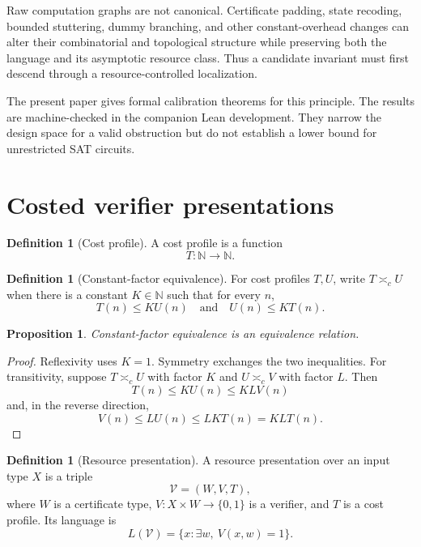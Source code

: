 \documentclass[11pt]{article}
\newtheorem{proposition}[theorem]{Proposition}
\theoremstyle{definition}
\newtheorem{definition}[theorem]{Definition}
\begin{document}
Raw computation graphs are not canonical.  Certificate padding, state
recoding, bounded stuttering, dummy branching, and other constant-overhead
changes can alter their combinatorial and topological structure while
preserving both the language and its asymptotic resource class.  Thus a
candidate invariant must first descend through a resource-controlled
localization.

The present paper gives formal calibration theorems for this principle.  The
results are machine-checked in the companion Lean development.  They narrow
the design space for a valid obstruction but do not establish a lower bound
for unrestricted SAT circuits.

\section{Costed verifier presentations}

\begin{definition}[Cost profile]
A cost profile is a function
\[
  T:\mathbb N\to\mathbb N.
\]
\end{definition}

\begin{definition}[Constant-factor equivalence]
For cost profiles \(T,U\), write \(T\asymp_c U\) when there is a constant
\(K\in\mathbb N\) such that for every \(n\),
\[
  T(n)\le K U(n)
  \quad\text{and}\quad
  U(n)\le K T(n).
\]
\end{definition}

\begin{proposition}
Constant-factor equivalence is an equivalence relation.
\end{proposition}

\begin{proof}
Reflexivity uses \(K=1\).  Symmetry exchanges the two inequalities.  For
transitivity, suppose \(T\asymp_c U\) with factor \(K\) and
\(U\asymp_c V\) with factor \(L\).  Then
\[
  T(n)\le K U(n)\le KL V(n)
\]
and, in the reverse direction,
\[
  V(n)\le L U(n)\le LK T(n)=KL T(n).
\]
\end{proof}

\begin{definition}[Resource presentation]
A resource presentation over an input type \(X\) is a triple
\[
  \mathcal V=(W,V,T),
\]
where \(W\) is a certificate type,
\(V:X\times W\to\{0,1\}\) is a verifier, and \(T\) is a cost profile.
Its language is
\[
  L(\mathcal V)=\{x:\exists w,\ V(x,w)=1\}.
\]
\end{definition}
\end{document}
